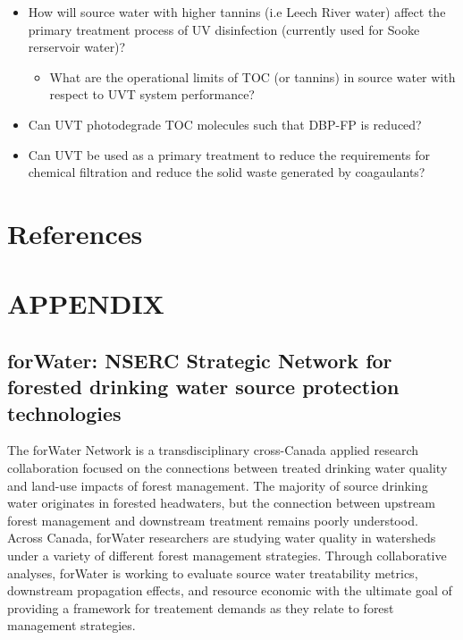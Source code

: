 \documentclass[]{article}
\providecommand{\tightlist}{%
  \setlength{\itemsep}{0pt}\setlength{\parskip}{0pt}}
\begin{document}
\begin{itemize}
\tightlist
\item
  How will source water with higher tannins (i.e Leech River water)
  affect the primary treatment process of UV disinfection (currently
  used for Sooke rerservoir water)?

  \begin{itemize}
  \tightlist
  \item
    What are the operational limits of TOC (or tannins) in source water
    with respect to UVT system performance?
  \end{itemize}
\item
  Can UVT photodegrade TOC molecules such that DBP-FP is reduced?
\item
  Can UVT be used as a primary treatment to reduce the requirements for
  chemical filtration and reduce the solid waste generated by
  coagaulants?
\end{itemize}

\section{References}\label{references}

\section{APPENDIX}\label{appendix}

\subsection{forWater: NSERC Strategic Network for forested drinking
water source protection
technologies}\label{forwater-nserc-strategic-network-for-forested-drinking-water-source-protection-technologies}

The forWater Network is a transdisciplinary cross-Canada applied
research collaboration focused on the connections between treated
drinking water quality and land-use impacts of forest management. The
majority of source drinking water originates in forested headwaters, but
the connection between upstream forest management and downstream
treatment remains poorly understood. Across Canada, forWater researchers
are studying water quality in watersheds under a variety of different
forest management strategies. Through collaborative analyses, forWater
is working to evaluate source water treatability metrics, downstream
propagation effects, and resource economic with the ultimate goal of
providing a framework for treatement demands as they relate to forest
management strategies.
\end{document}
